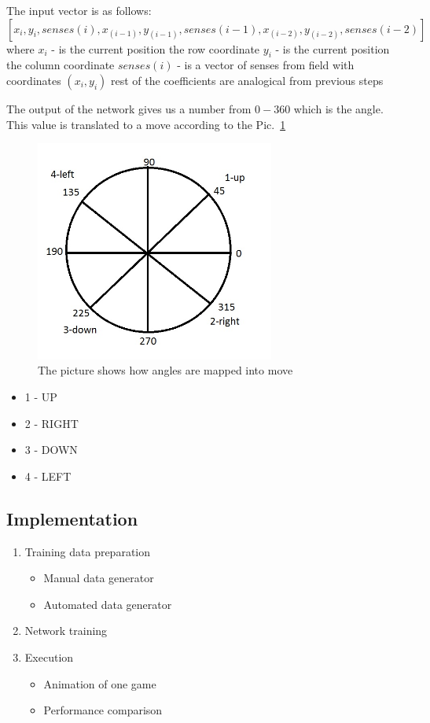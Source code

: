 \documentclass[a4paper]{article}
\begin{document}
 The input vector is as follows:
	$$
		[x_i, y_i, senses(i), x_(i-1), y_(i-1), senses(i-1), x_(i-2), y_(i-2), senses(i-2)]
	$$
	where 
		$x_i$ - is the current position the row coordinate
		$y_i$ - is the current position the column coordinate
		$senses(i)$ - is a vector of senses from field with coordinates $(x_i, y_i)$
		rest of the coefficients are analogical from previous steps
	
	The output of the network gives us a number from $0-360$ which is the angle. This value
	is translated to a move according to the Pic.~\ref{pic:compass}
	\begin{figure}[!h]
	\centering	
	\includegraphics[width=0.7\textwidth]{pic/kompass.jpg}
	\caption{The picture shows how angles are mapped into move}
\label{pic:compass}
\end{figure}
	\begin{itemize}
		\item 1 - UP
		\item 2 - RIGHT
		\item 3 - DOWN
		\item 4 - LEFT
	\end{itemize}
	

\subsection{Implementation }
		\begin{enumerate}
		\item Training data preparation
			\begin{itemize}
				\item Manual data generator 
				\item Automated data generator
			\end{itemize}
		\item Network training 
		\item Execution
			\begin{itemize}
				\item Animation of one game
				\item Performance comparison 
			\end{itemize}
	\end{enumerate}
	
\end{document}
